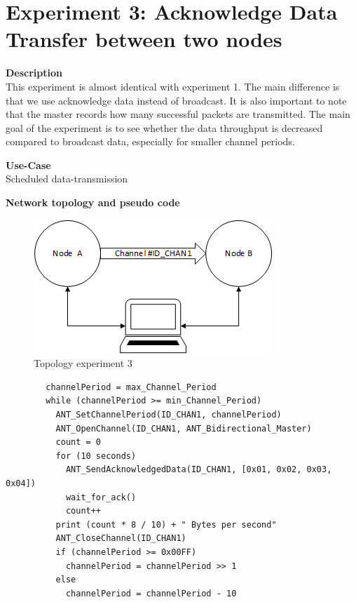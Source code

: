 \section{Experiment 3: Acknowledge Data Transfer between two nodes}
\begin{description} 
	\item{\textbf{Description}} \hfill \\ This experiment is almost identical with experiment 1. The main difference is that we use acknowledge data instead of broadcast. It is also important to note that the master records how many successful packets are transmitted. The main goal of the experiment is to see whether the data throughput is decreased compared to broadcast data, especially for smaller channel periods.
	\item{\textbf{Use-Case}} \hfill \\ Scheduled data-transmission
	\item{\textbf{Network topology and pseudo code}} \hfill \\
	\begin{figure}[H]
		\centering
		\includegraphics[scale=1]{content/images/exp_topo.png}
		\caption{Topology experiment 3}
	\end{figure}
	\begin{code}[H]
		\begin{verbatim}
		channelPeriod = max_Channel_Period
		while (channelPeriod >= min_Channel_Period) 
		  ANT_SetChannelPeriod(ID_CHAN1, channelPeriod)
		  ANT_OpenChannel(ID_CHAN1, ANT_Bidirectional_Master)
		  count = 0
		  for (10 seconds) 
		    ANT_SendAcknowledgedData(ID_CHAN1, [0x01, 0x02, 0x03, 0x04])	   
		    wait_for_ack()
		    count++
		  print (count * 8 / 10) + " Bytes per second"	  
		  ANT_CloseChannel(ID_CHAN1)
		  if (channelPeriod >= 0x00FF)
		    channelPeriod = channelPeriod >> 1
		  else
		    channelPeriod = channelPeriod - 10
		\end{verbatim}
		\caption{Acknowledge data transfer (Master)}\label{lst:mExp3}
	\end{code}
	

\end{description}
